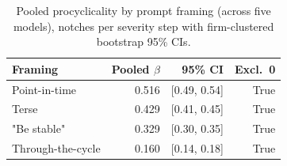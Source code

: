\begin{table}[t]
\centering
\caption{Pooled procyclicality by prompt framing (across five models), notches per severity step with firm-clustered bootstrap 95\% CIs.}
\label{tab:gradient}
\begin{tabular}{lrrr}
\toprule
Framing & Pooled $\beta$ & 95\% CI & Excl.\ 0 \\
\midrule
Point-in-time & 0.516 & [0.49, 0.54] & True \\
Terse & 0.429 & [0.41, 0.45] & True \\
"Be stable" & 0.329 & [0.30, 0.35] & True \\
Through-the-cycle & 0.160 & [0.14, 0.18] & True \\
\bottomrule
\end{tabular}
\end{table}
